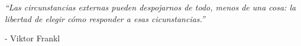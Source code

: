 \documentclass[a4paper, 11pt, spanish, twoside, openright]{book}
\newcommand\blankpage{%
    \null
    \thispagestyle{empty}%
    \newpage}
\begin{document}
 




\newpage
\thispagestyle{empty}


%     




\blankpage





\blankpage


 
\newpage
\thispagestyle{empty}

\begin{flushright} %
\vspace*{5cm} %

\textit{“Las circunstancias externas pueden despojarnos de todo, menos de una cosa: la libertad de elegir cómo responder a esas cicunstancias.”} 

\medskip %
- Viktor Frankl 

\end{flushright}
\end{document}
